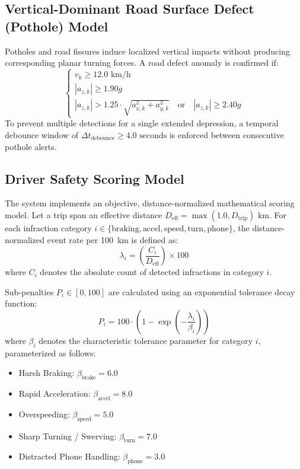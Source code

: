 \subsection{Vertical-Dominant Road Surface Defect (Pothole) Model}
Potholes and road fissures induce localized vertical impacts without producing corresponding planar turning forces. A road defect anomaly is confirmed if:
\begin{equation}
    \begin{cases}
        v_k \ge 12.0\text{ km/h} \\
        |a_{z,k}| \ge 1.90g \\
        |a_{z,k}| > 1.25 \cdot \sqrt{a_{x,k}^2 + a_{y,k}^2} \quad \text{or} \quad |a_{z,k}| \ge 2.40g
    \end{cases}
\end{equation}
To prevent multiple detections for a single extended depression, a temporal debounce window of $\Delta t_{\text{debounce}} \ge 4.0\text{ seconds}$ is enforced between consecutive pothole alerts.

\subsection{Driver Safety Scoring Model}
The system implements an objective, distance-normalized mathematical scoring model. Let a trip span an effective distance $D_{\text{eff}} = \max(1.0, D_{\text{trip}})\text{ km}$. For each infraction category $i \in \{\text{braking}, \text{accel}, \text{speed}, \text{turn}, \text{phone}\}$, the distance-normalized event rate per 100~km is defined as:
\begin{equation}
    \lambda_i = \left(\frac{C_i}{D_{\text{eff}}}\right) \times 100
\end{equation}
where $C_i$ denotes the absolute count of detected infractions in category $i$.

Sub-penalties $P_i \in [0, 100]$ are calculated using an exponential tolerance decay function:
\begin{equation}
    P_i = 100 \cdot \left(1 - \exp\left(-\frac{\lambda_i}{\beta_i}\right)\right)
\end{equation}
where $\beta_i$ denotes the characteristic tolerance parameter for category $i$, parameterized as follows:
\begin{itemize}
    \item Harsh Braking: $\beta_{\text{brake}} = 6.0$
    \item Rapid Acceleration: $\beta_{\text{accel}} = 8.0$
    \item Overspeeding: $\beta_{\text{speed}} = 5.0$
    \item Sharp Turning / Swerving: $\beta_{\text{turn}} = 7.0$
    \item Distracted Phone Handling: $\beta_{\text{phone}} = 3.0$
\end{itemize}

